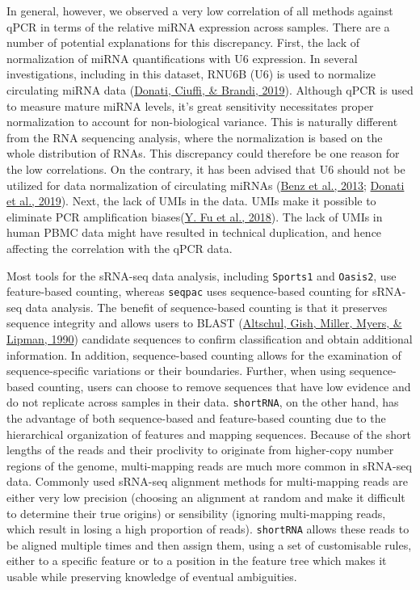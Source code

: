 \documentclass[12pt,twoside]{reedthesis}
\begin{document}
In general, however, we observed a very low correlation of all methods
against qPCR in terms of the relative miRNA expression across samples.
There are a number of potential explanations for this discrepancy.
First, the lack of normalization of miRNA quantifications with U6
expression. In several investigations, including in this dataset, RNU6B
(U6) is used to normalize circulating miRNA data (\protect\hyperlink{ref-donati2019}{Donati, Ciuffi, \& Brandi, 2019}). Although
qPCR is used to measure mature miRNA levels, it's great sensitivity
necessitates proper normalization to account for non-biological
variance. This is naturally different from the RNA sequencing analysis,
where the normalization is based on the whole distribution of RNAs. This
discrepancy could therefore be one reason for the low correlations. On
the contrary, it has been advised that U6 should not be utilized for
data normalization of circulating miRNAs (\protect\hyperlink{ref-benz2013}{Benz et al., 2013}; \protect\hyperlink{ref-donati2019}{Donati et al., 2019}). Next,
the lack of UMIs in the data. UMIs make it possible to eliminate PCR
amplification biases(\protect\hyperlink{ref-fu2018}{Y. Fu et al., 2018}). The lack of UMIs in human PBMC data might
have resulted in technical duplication, and hence affecting the
correlation with the qPCR data.

Most tools for the sRNA-seq data analysis, including \texttt{Sports1} and \texttt{Oasis2},
use feature-based counting, whereas \texttt{seqpac} uses sequence-based counting
for sRNA-seq data analysis. The benefit of sequence-based counting is
that it preserves sequence integrity and allows users to BLAST
(\protect\hyperlink{ref-altschul1990}{Altschul, Gish, Miller, Myers, \& Lipman, 1990}) candidate sequences to confirm classification and obtain
additional information. In addition, sequence-based counting allows for
the examination of sequence-specific variations or their boundaries.
Further, when using sequence-based counting, users can choose to remove
sequences that have low evidence and do not replicate across samples in
their data. \texttt{shortRNA}, on the other hand, has the advantage of both
sequence-based and feature-based counting due to the hierarchical
organization of features and mapping sequences. Because of the short
lengths of the reads and their proclivity to originate from higher-copy
number regions of the genome, multi-mapping reads are much more common
in sRNA-seq data. Commonly used sRNA-seq alignment methods for
multi-mapping reads are either very low precision (choosing an alignment
at random and make it difficult to determine their true origins) or
sensibility (ignoring multi-mapping reads, which result in losing a high
proportion of reads). \texttt{shortRNA} allows these reads to be aligned multiple
times and then assign them, using a set of customisable rules, either to
a specific feature or to a position in the feature tree which makes it
usable while preserving knowledge of eventual ambiguities.
\end{document}
